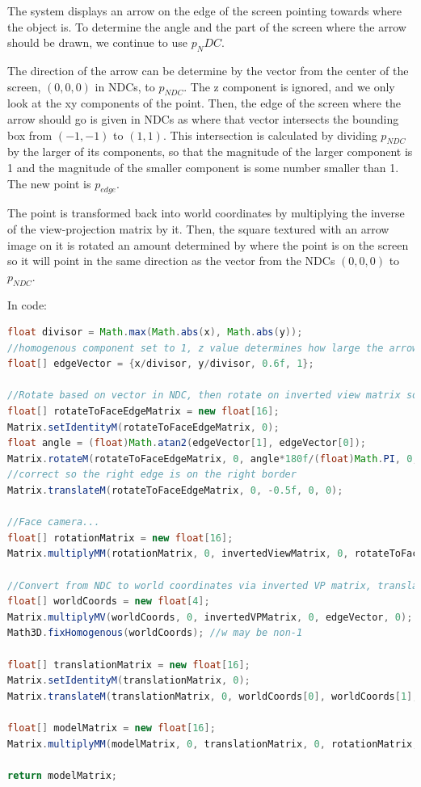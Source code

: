 The system displays an arrow on the edge of the screen pointing towards where the object is. To determine the angle and the part of the screen where the arrow should be drawn, we continue to use $p_NDC$.

The direction of the arrow can be determine by the vector from the center of the screen, $(0, 0, 0)$ in NDCs, to $p_{NDC}$. The z component is ignored, and we only look at the xy components of the point. Then, the edge of the screen where the arrow should go is given in NDCs as where that vector intersects the bounding box from $(-1, -1)$ to $(1, 1)$. This intersection is calculated by dividing $p_{NDC}$ by the larger of its components, so that the magnitude of the larger component is 1 and the magnitude of the smaller component is some number smaller than 1. The new point is $p_{edge}$.

The point is transformed back into world coordinates by multiplying the inverse of the view-projection matrix by it. Then, the square textured with an arrow image on it is rotated an amount determined by where the point is on the screen so it will point in the same direction as the vector from the NDCs $(0, 0, 0)$ to $p_{NDC}$. 

In code:

\begin{lstlisting}[language=Java]
float divisor = Math.max(Math.abs(x), Math.abs(y));
//homogenous component set to 1, z value determines how large the arrow is later
float[] edgeVector = {x/divisor, y/divisor, 0.6f, 1}; 

//Rotate based on vector in NDC, then rotate on inverted view matrix so it faces the camera
float[] rotateToFaceEdgeMatrix = new float[16];
Matrix.setIdentityM(rotateToFaceEdgeMatrix, 0);
float angle = (float)Math.atan2(edgeVector[1], edgeVector[0]);
Matrix.rotateM(rotateToFaceEdgeMatrix, 0, angle*180f/(float)Math.PI, 0, 0, 1f);
//correct so the right edge is on the right border
Matrix.translateM(rotateToFaceEdgeMatrix, 0, -0.5f, 0, 0); 

//Face camera...
float[] rotationMatrix = new float[16];
Matrix.multiplyMM(rotationMatrix, 0, invertedViewMatrix, 0, rotateToFaceEdgeMatrix, 0);

//Convert from NDC to world coordinates via inverted VP matrix, translate matrix to that
float[] worldCoords = new float[4];
Matrix.multiplyMV(worldCoords, 0, invertedVPMatrix, 0, edgeVector, 0);
Math3D.fixHomogenous(worldCoords); //w may be non-1

float[] translationMatrix = new float[16];
Matrix.setIdentityM(translationMatrix, 0);
Matrix.translateM(translationMatrix, 0, worldCoords[0], worldCoords[1], worldCoords[2]);

float[] modelMatrix = new float[16];
Matrix.multiplyMM(modelMatrix, 0, translationMatrix, 0, rotationMatrix, 0);

return modelMatrix;
\end{lstlisting}

